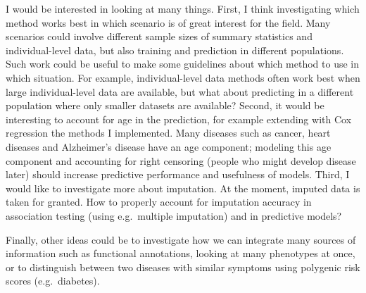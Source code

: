 I would be interested in looking at many things. 
First, I think investigating which method works best in which scenario is of great interest for the field. 
Many scenarios could involve different sample sizes of summary statistics and individual-level data, but also training and prediction in different populations.
Such work could be useful to make some guidelines about which method to use in which situation. For example, individual-level data methods often work best when large individual-level data are available, but what about predicting in a different population where only smaller datasets are available?
Second, it would be interesting to account for age in the prediction, for example extending with Cox regression the methods I implemented. Many diseases such as cancer, heart diseases and Alzheimer's disease have an age component; modeling this age component and accounting for right censoring (people who might develop disease later) should increase predictive performance and usefulness of models.
Third, I would like to investigate more about imputation. At the moment, imputed data is taken for granted. How to properly account for imputation accuracy in association testing (using e.g.\ multiple imputation) and in predictive models? 

Finally, other ideas could be to investigate how we can integrate many sources of information such as functional annotations, looking at many phenotypes at once, or to distinguish between two diseases with similar symptoms using polygenic risk scores (e.g.\ diabetes).


